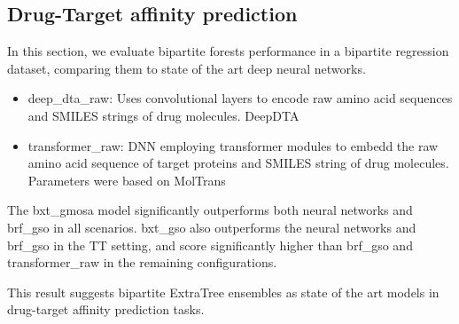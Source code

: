 \documentclass[conference]{IEEEtran}
\begin{document}



\subsection{Drug-Target affinity prediction}

In this section, we evaluate bipartite forests performance in a bipartite regression dataset, comparing them to state of the art deep neural networks.

\begin{itemize}
    \item deep\_dta\_raw: Uses convolutional layers to encode raw amino acid sequences and SMILES strings of drug molecules. DeepDTA \cite{Ozturk_2018}
    \item transformer\_raw: DNN employing transformer modules to embedd the raw amino acid sequence of target proteins and SMILES string of drug molecules. Parameters were based on MolTrans \cite{}
\end{itemize}

The bxt\_gmosa model \cite{Pliakos_2020} significantly outperforms both neural networks and brf\_gso in all scenarios. bxt\_gso also outperforms the neural networks and brf\_gso in the TT setting, and score significantly higher than brf\_gso and transformer\_raw in the remaining configurations.

This result suggests bipartite ExtraTree ensembles as state of the art models in drug-target affinity prediction tasks.
\end{document}
